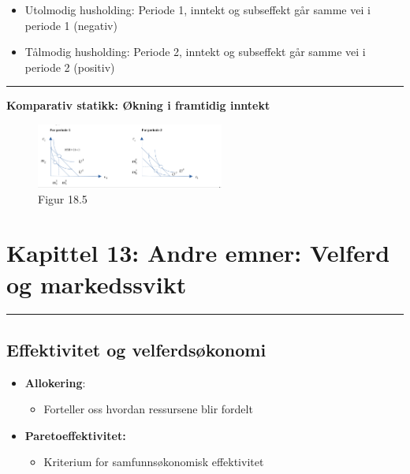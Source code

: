 \documentclass[
  letterpaper,
  DIV=11,
  numbers=noendperiod]{scrartcl}
\providecommand{\tightlist}{%
  \setlength{\itemsep}{0pt}\setlength{\parskip}{0pt}}\usepackage{longtable,booktabs,array}
\begin{document}
\begin{itemize}
\tightlist
\item
  Utolmodig husholding: Periode 1, inntekt og subseffekt går samme vei i
  periode 1 (negativ)
\item
  Tålmodig husholding: Periode 2, inntekt og subseffekt går samme vei i
  periode 2 (positiv)
\end{itemize}

\begin{center}\rule{0.5\linewidth}{0.5pt}\end{center}

\textbf{Komparativ statikk: Økning i framtidig inntekt}

\begin{figure}[H]

{\centering \includegraphics[width=0.55\textwidth,height=\textheight]{drawio/int_tilpasning_inntokning.png}

}

\caption{Figur 18.5}

\end{figure}%

\section{Kapittel 13: Andre emner: Velferd og
markedssvikt}\label{kapittel-13-andre-emner-velferd-og-markedssvikt}

\begin{center}\rule{0.5\linewidth}{0.5pt}\end{center}

\subsection{Effektivitet og
velferdsøkonomi}\label{effektivitet-og-velferdsuxf8konomi}

\begin{itemize}
\tightlist
\item
  \textbf{Allokering}:

  \begin{itemize}
  \tightlist
  \item
    Forteller oss hvordan ressursene blir fordelt
  \end{itemize}
\item
  \textbf{Paretoeffektivitet:}

  \begin{itemize}
  \tightlist
  \item
    Kriterium for samfunnsøkonomisk effektivitet
  \end{itemize}
\end{itemize}
\end{document}
